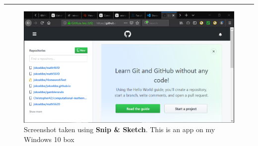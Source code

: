 \documentclass[10pt,fleqn]{article}
\begin{document}
\vskip0.1in\hrule\vskip0.1in
\vfill
\begin{figure}[h]
\centering
\includegraphics{../images/github_03.png}
\caption{{Screenshot} taken using {\bf Snip \& Sketch}. This is an app on
         my Windows 10 box}
\end{figure}
\eject
\end{document}
